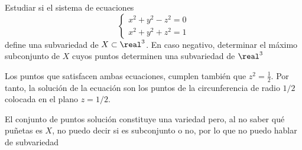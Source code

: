 \begin{problem}[9]
Estudiar si el sistema de ecuaciones
\[ \left\{ \begin{array}{c}
x^2+y^2-z^2=0\\
x^2+y^2+z^2=1 \end{array} \right.\]
define una subvariedad de $X \subset \real^3$. En caso negativo, determinar el máximo subconjunto de $X$ cuyos puntos determinen una subvariedad de $\real^3$
\solution


Los puntos que satisfacen ambas ecuaciones, cumplen también que $z^2=\frac{1}{2}$. Por tanto, la solución de la ecuación son los puntos de la circunferencia de radio $1/2$ colocada en el plano $z=1/2$.

El conjunto de puntos solución constituye una variedad pero, al no saber qué puñetas es $X$, no puedo decir si es subconjunto o no, por lo que no puedo hablar de subvariedad

\end{problem}

